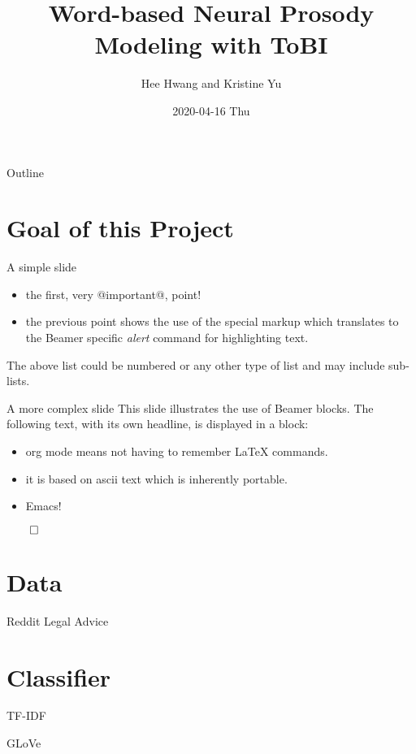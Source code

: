 \documentclass[bigger]{beamer}
\author{Hee Hwang and Kristine Yu}
\date{2020-04-16 Thu}
\title{Word-based Neural Prosody Modeling with ToBI}
\begin{document}
\maketitle
\begin{frame}{Outline}
\tableofcontents
\end{frame}




\section{Goal of this Project}
\label{sec:org4c67949}
\begin{frame}[label={sec:orgb4b7b15}]{A simple slide}
\begin{itemize}
\item the first, very @important@, point!
\item the previous point shows the use of the special markup which
translates to the Beamer specific \emph{alert} command for highlighting
text.
\end{itemize}


The above list could be numbered or any other type of list and may
include sub-lists.
\end{frame}

\begin{frame}[label={sec:orgd344a05}]{A more complex slide}
This slide illustrates the use of Beamer blocks.  The following text,
with its own headline, is displayed in a block:


\begin{theorem}
\begin{itemize}
\item org mode means not having to remember \LaTeX{} commands.
\item it is based on ascii text which is inherently portable.
\item Emacs!
\end{itemize}

\hfill \(\qed\)
\end{theorem}
\end{frame}

\section{Data}
\label{sec:orga2fb10a}
\begin{frame}[label={sec:org7ad86bd}]{Reddit Legal Advice}
\end{frame}
\section{Classifier}
\label{sec:org4428d01}
\begin{frame}[label={sec:org327bcad}]{TF-IDF}
\end{frame}
\begin{frame}[label={sec:org91cea65}]{GLoVe}
\end{frame}
\end{document}

